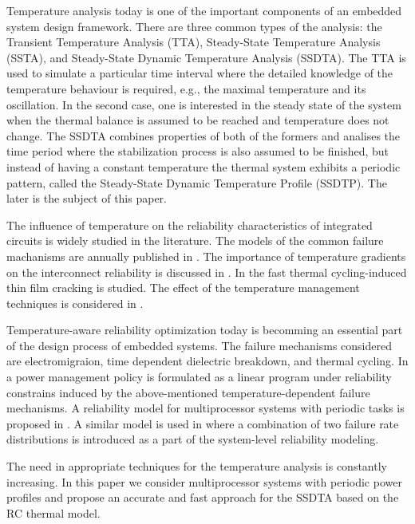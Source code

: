 Temperature analysis today is one of the important components of an embedded system design framework. There are three common types of the analysis: the Transient Temperature Analysis (TTA), Steady-State Temperature Analysis (SSTA), and Steady-State Dynamic Temperature Analysis (SSDTA). The TTA is used to simulate a particular time interval where the detailed knowledge of the temperature behaviour is required, e.g., the maximal temperature and its oscillation. In the second case, one is interested in the steady state of the system when the thermal balance is assumed to be reached and temperature does not change. The SSDTA combines properties of both of the formers and analises the time period where the stabilization process is also assumed to be finished, but instead of having a constant temperature the thermal system exhibits a periodic pattern, called the Steady-State Dynamic Temperature Profile (SSDTP). The later is the subject of this paper.


The influence of temperature on the reliability characteristics of integrated circuits is widely studied in the literature. The models of the common failure machanisms are annually published in \cite{jedec2010}. The importance of temperature gradients on the interconnect reliability is discussed in \cite{lu2004}. In \cite{hieu2004} the fast thermal cycling-induced thin film cracking is studied. The effect of the temperature management techniques is considered in \cite{srinivasan2003}.

Temperature-aware reliability optimization today is becomming an essential part of the design process of embedded systems. The failure mechanisms considered are electromigraion, time dependent dielectric breakdown, and thermal cycling. In \cite{coskun2006} a power management policy is formulated as a linear program under reliability constrains induced by the above-mentioned temperature-dependent failure mechanisms. A reliability model for multiprocessor systems with periodic tasks is proposed in \cite{huang2009}. A similar model is used in \cite{xiang2010} where a combination of two failure rate distributions is introduced as a part of the system-level reliability modeling.

The need in appropriate techniques for the temperature analysis is constantly increasing. In this paper we consider multiprocessor systems with periodic power profiles and propose an accurate and fast approach for the SSDTA based on the RC thermal model.


